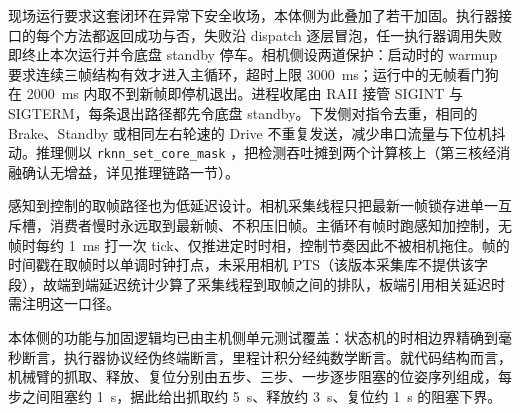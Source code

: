 现场运行要求这套闭环在异常下安全收场，本体侧为此叠加了若干加固。执行器接口的每个方法都返回成功与否，失败沿 dispatch 逐层冒泡，任一执行器调用失败即终止本次运行并令底盘 standby 停车。相机侧设两道保护：启动时的 warmup 要求连续三帧结构有效才进入主循环，超时上限 3000~ms；运行中的无帧看门狗在 2000~ms 内取不到新帧即停机退出。进程收尾由 RAII 接管 SIGINT 与 SIGTERM，每条退出路径都先令底盘 standby。下发侧对指令去重，相同的 Brake、Standby 或相同左右轮速的 Drive 不重复发送，减少串口流量与下位机抖动。推理侧以 \texttt{rknn\_set\_core\_mask} ，把检测吞吐摊到两个计算核上（第三核经消融确认无增益，详见推理链路一节）。

感知到控制的取帧路径也为低延迟设计。相机采集线程只把最新一帧锁存进单一互斥槽，消费者慢时永远取到最新帧、不积压旧帧。主循环有帧时跑感知加控制，无帧时每约 1~ms 打一次 tick、仅推进定时时相，控制节奏因此不被相机拖住。帧的时间戳在取帧时以单调时钟打点，未采用相机 PTS（该版本采集库不提供该字段），故端到端延迟统计少算了采集线程到取帧之间的排队，板端引用相关延迟时需注明这一口径。

本体侧的功能与加固逻辑均已由主机侧单元测试覆盖：状态机的时相边界精确到毫秒断言，执行器协议经伪终端断言，里程计积分经纯数学断言。就代码结构而言，机械臂的抓取、释放、复位分别由五步、三步、一步逐步阻塞的位姿序列组成，每步之间阻塞约 1~s，据此给出抓取约 5~s、释放约 3~s、复位约 1~s 的阻塞下界。

